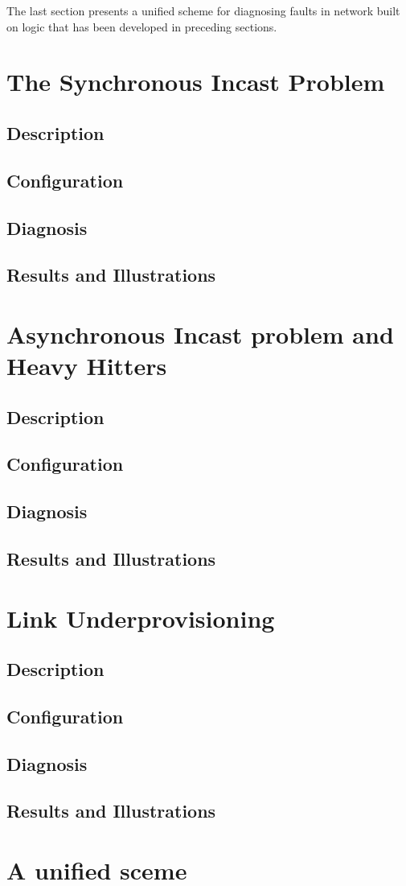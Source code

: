 The last section presents a unified scheme for diagnosing faults in network built on logic that has been developed
in preceding sections.

\section{The Synchronous Incast Problem}
\subsection{Description}
\subsection{Configuration}
\subsection{Diagnosis}
\subsection{Results and Illustrations}

\section{Asynchronous Incast problem and Heavy Hitters}
\subsection{Description}
\subsection{Configuration}
\subsection{Diagnosis}
\subsection{Results and Illustrations}

\section{Link Underprovisioning}
\subsection{Description}
\subsection{Configuration}
\subsection{Diagnosis}
\subsection{Results and Illustrations}

\section{A unified sceme}